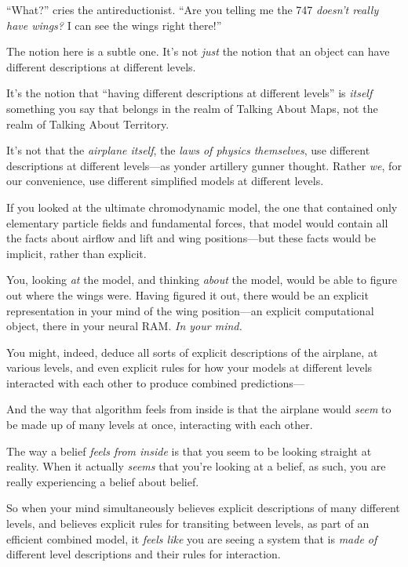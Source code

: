 {
 ``What?'' cries the
antireductionist. ``Are you telling me the 747
\textit{doesn't really have wings?} I can see the wings
right there!''}

{
 The notion here is a subtle one. It's not
\textit{just} the notion that an object can have different descriptions
at different levels.}

{
 It's the notion that ``having
different descriptions at different levels'' is
\textit{itself} something you say that belongs in the realm of Talking
About Maps, not the realm of Talking About Territory.}

{
 It's not that the \textit{airplane itself}, the
\textit{laws of physics themselves}, use different descriptions at
different levels---as yonder artillery gunner thought. Rather
\textit{we}, for our convenience, use different simplified models at
different levels.}

{
 If you looked at the ultimate chromodynamic model, the one that
contained only elementary particle fields and fundamental forces, that
model would contain all the facts about airflow and lift and wing
positions---but these facts would be implicit, rather than explicit.}

{
 You, looking \textit{at} the model, and thinking \textit{about}
the model, would be able to figure out where the wings were. Having
figured it out, there would be an explicit representation in your mind
of the wing position---an explicit computational object, there in your
neural RAM. \textit{In your mind.}}

{
 You might, indeed, deduce all sorts of explicit descriptions of
the airplane, at various levels, and even explicit rules for how your
models at different levels interacted with each other to produce
combined predictions---}

{
 And the way that algorithm feels from inside is that the airplane
would \textit{seem} to be made up of many levels at once, interacting
with each other.}

{
 The way a belief \textit{feels from inside} is that you seem to be
looking straight at reality. When it actually \textit{seems} that
you're looking at a belief, as such, you are really
experiencing a belief about belief.}

{
 So when your mind simultaneously believes explicit descriptions of
many different levels, and believes explicit rules for transiting
between levels, as part of an efficient combined model, it
\textit{feels like} you are seeing a system that is \textit{made of}
different level descriptions and their rules for interaction.}


